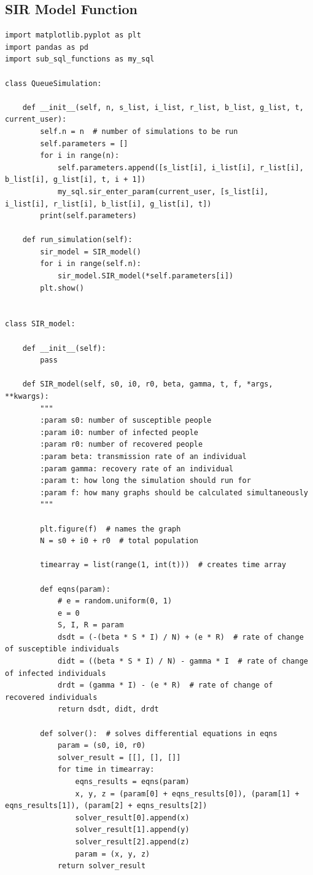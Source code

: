 \documentclass[11pt, a4paper]{article}
\begin{document}
\subsection{SIR Model Function}
\begin{lstlisting}
import matplotlib.pyplot as plt
import pandas as pd
import sub_sql_functions as my_sql

class QueueSimulation:

    def __init__(self, n, s_list, i_list, r_list, b_list, g_list, t, current_user):
        self.n = n  # number of simulations to be run
        self.parameters = []
        for i in range(n):
            self.parameters.append([s_list[i], i_list[i], r_list[i], b_list[i], g_list[i], t, i + 1])
            my_sql.sir_enter_param(current_user, [s_list[i], i_list[i], r_list[i], b_list[i], g_list[i], t])
        print(self.parameters)

    def run_simulation(self):
        sir_model = SIR_model()
        for i in range(self.n):
            sir_model.SIR_model(*self.parameters[i])
        plt.show()


class SIR_model:

    def __init__(self):
        pass

    def SIR_model(self, s0, i0, r0, beta, gamma, t, f, *args, **kwargs):
        """
        :param s0: number of susceptible people
        :param i0: number of infected people
        :param r0: number of recovered people
        :param beta: transmission rate of an individual
        :param gamma: recovery rate of an individual
        :param t: how long the simulation should run for
        :param f: how many graphs should be calculated simultaneously
        """

        plt.figure(f)  # names the graph
        N = s0 + i0 + r0  # total population

        timearray = list(range(1, int(t)))  # creates time array

        def eqns(param):
            # e = random.uniform(0, 1)
            e = 0
            S, I, R = param
            dsdt = (-(beta * S * I) / N) + (e * R)  # rate of change of susceptible individuals
            didt = ((beta * S * I) / N) - gamma * I  # rate of change of infected individuals
            drdt = (gamma * I) - (e * R)  # rate of change of recovered individuals
            return dsdt, didt, drdt

        def solver():  # solves differential equations in eqns
            param = (s0, i0, r0)
            solver_result = [[], [], []]
            for time in timearray:
                eqns_results = eqns(param)
                x, y, z = (param[0] + eqns_results[0]), (param[1] + eqns_results[1]), (param[2] + eqns_results[2])
                solver_result[0].append(x)
                solver_result[1].append(y)
                solver_result[2].append(z)
                param = (x, y, z)
            return solver_result


\end{lstlisting}
\end{document}
